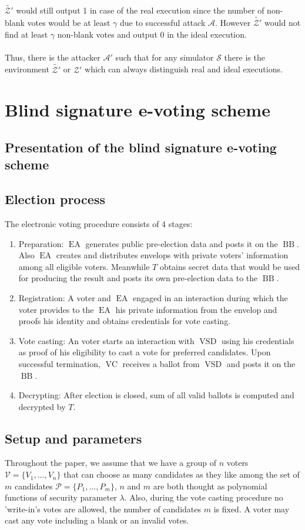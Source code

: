 \documentclass[12pt]{article}
\DeclareMathOperator{\vsd}{VSD}
\DeclareMathOperator{\ea}{EA}
\DeclareMathOperator{\bb}{BB}
\DeclareMathOperator{\voc}{VC}
\begin{document}
$\tilde{\mathcal{Z'}}$ would still output 1 in case of the real execution since the number of non-blank votes would be at least $\gamma$ due to successful attack  $\mathcal{A}$. However  $\tilde{\mathcal{Z'}}$ would not find at least $\gamma$ non-blank votes and output 0 in the ideal execution. \\\\
Thus, there is the attacker $\mathcal{A'}$ such that for any simulator $\mathcal{S}$ there is the environment $\tilde{\mathcal{Z'}}$ or $\mathcal{Z'}$ which can always distinguish real and ideal executions. 
%
%
\section {Blind signature e-voting scheme}
\subsection{Presentation of the blind signature e-voting scheme}
\subsection{Election process}
The electronic voting procedure consists of 4 stages:
\begin{enumerate}
\item Preparation: $\ea$ generates public pre-election data and posts it on the $\bb$. Also $\ea$ creates and distributes envelops with private voters' information among all eligible voters. Meanwhile $T$ obtains secret data that would be used for producing the result and posts its own pre-election data to the $\bb$. 
\item Registration: A voter and $\ea$ engaged in an interaction during which the voter provides to the $\ea$  his private information from the envelop and proofs his identity and obtains credentials for vote casting. 
\item Vote casting: An voter starts an interaction with $\vsd$ using his credentials as proof of his eligibility to cast a vote for preferred candidates. Upon successful termination, $\voc$ receives a ballot from $\vsd$ and posts it on the $\bb$. 
\item Decrypting: After election is closed, sum of all valid ballots is computed and decrypted by $T$. 
\end{enumerate}
\subsection{Setup and parameters}
Throughout the paper, we assume that we have a group of $n$ voters $\mathcal{V} = \{V_1,\dots,V_n\}$ that can choose as many candidates as they like among the set of $m$ candidates $\mathcal{P} = \{P_1,\dots,P_m\}$, $n$ and $m$ are both thought as polynomial functions of security parameter $\lambda$. Also, during the vote casting procedure no 'write-in's votes are allowed, the number of candidates $m$ is fixed. A voter may cast any vote including a blank or an invalid votes. \\
\end{document}
